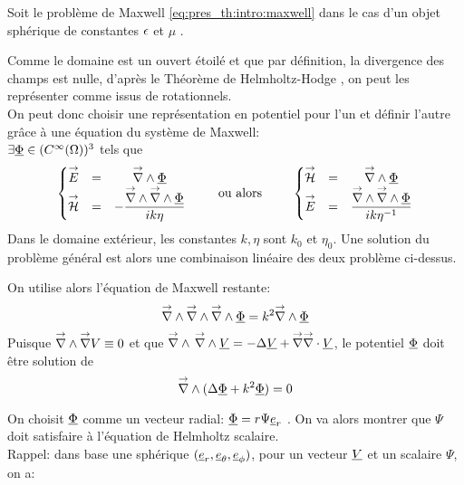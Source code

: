 Soit le problème de Maxwell \eqref{eq:pres_th:intro:maxwell} dans le cas d'un objet sphérique de constantes \(\epsilon\) et \(\mu\)%
.

Comme le domaine est un ouvert étoilé et que par définition, la divergence des champs est nulle, d'après le Théorème de Helmholtz-Hodge \cite{gui_rigorous_2007}, on peut les représenter comme issus de rotationnels.\\
On peut donc choisir une représentation en potentiel pour l'un et définir l'autre grâce à une équation du système de Maxwell:\\
 \(\exists \underline{\Phi} \in (C^\infty(\Omega))^3\) tels que
\begin{equation}
  \label{eq:sol_maxwell:pot_hertz}
  \left\lbrace\begin{matrix}
    {\overset{\rightarrow}{E}} &=& {\overset{\rightarrow}{\nabla}}\wedge \underline{\Phi} \\
    {\overset{\rightarrow}{\mathcal{H}}} &=& - \dfrac{{\overset{\rightarrow}{\nabla}}\wedge {\overset{\rightarrow}{\nabla}}\wedge \underline{\Phi}}{ik\eta}
  \end{matrix} \right.
  \qquad \text{ ou alors } \qquad
  \left\lbrace\begin{matrix}
    {\overset{\rightarrow}{\mathcal{H}}} &=& {\overset{\rightarrow}{\nabla}}\wedge \underline{\Phi}\\
    {\overset{\rightarrow}{E}} &=& \dfrac{{\overset{\rightarrow}{\nabla}}\wedge {\overset{\rightarrow}{\nabla}}\wedge \underline{\Phi}}{ik\eta^{-1}}\\
  \end{matrix}\right.
\end{equation}
Dans le domaine extérieur, les constantes \(k,\eta\) sont \(k_0\) et \(\eta_0\).
Une solution du problème général est alors une combinaison linéaire des deux problème ci-dessus.

On utilise alors l'équation de Maxwell restante:
\[
    {\overset{\rightarrow}{\nabla}}\wedge {\overset{\rightarrow}{\nabla}}\wedge {\overset{\rightarrow}{\nabla}}\wedge \underline{\Phi} = k^2 {\overset{\rightarrow}{\nabla}}\wedge \underline{\Phi}
\]
Puisque \({\overset{\rightarrow}{\nabla}}\wedge  {\overset{\rightarrow}{\nabla}}  V  \equiv 0\) et que \({\overset{\rightarrow}{\nabla}}\wedge\, {\overset{\rightarrow}{\nabla}}\wedge \underline{V} = -\Delta \underline{V} + {\overset{\rightarrow}{\nabla}} {\overset{\rightarrow}{\nabla}}\cdot \underline{V}\), le potentiel \(\underline{\Phi}\) doit être solution de 
\begin{equation}
  \label{eq:sol_maxwell:helmholtz_vect}
  {\overset{\rightarrow}{\nabla}}\wedge ( \Delta \underline{\Phi} + k^2 \underline{\Phi} ) = 0
\end{equation}

On choisit \(\underline{\Phi}\) comme un vecteur radial: \(\underline{\Phi} = r \Psi \underline{e}_r\) \cite[p.~84]{bohren_absorption_2004}. On va alors montrer que \(\Psi\) doit satisfaire à l'équation de Helmholtz scalaire.\\

Rappel: dans base une sphérique \((\underline{e}_r, \underline{e}_\theta, \underline{e}_\phi)\), pour 
un vecteur \(\underline{V}\) 
et un scalaire \(\Psi\), on a:

